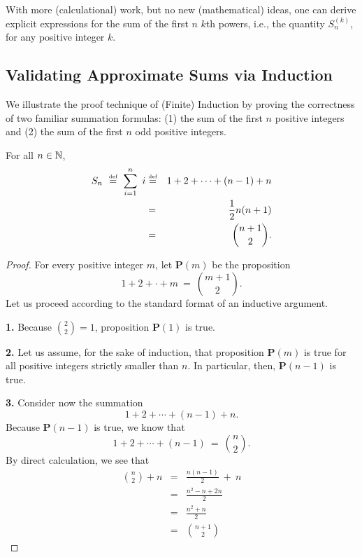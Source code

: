\documentclass{article}
\begin{document}
\begin{itemize}
With more (calculational) work, but no new (mathematical) ideas, one
can derive explicit expressions for the sum of the first $n$ $k$th
powers, i.e., the quantity $S^{(k)}_n$, for any positive integer $k$.


\subsection{Validating Approximate Sums via Induction}
\label{sec:Sums-Induction}


We illustrate the proof technique of (Finite) Induction by proving the
correctness of two familiar summation formulas: (1) the sum of the
first $n$ positive integers and (2) the sum of the first $n$ odd
positive integers.


\begin{center}
\label{thm:sum-1-to-n-induction}
For all $n \in \mathbb{N}$,
\begin{eqnarray}
\nonumber
S_n \ \stackrel{\mbox{{\tiny def}}}{=} \ \sum_{i=1}^n \ i
 & \stackrel{\mbox{{\tiny def}}}{=} &
 1 + 2 + \cdots + (n-1) + n \\
\label{eq:sum-first-n}
 & = & {1 \over 2} n (n+1) \\
\nonumber
 & = & {{n+1}  \choose 2}.
\end{eqnarray}
\end{center}

\begin{proof}
For every positive integer $m$, let {\bf P}$(m)$ be the proposition
\[  1 + 2 + \cdot + m \ = \ {{m+1} \choose 2}. \]
Let us proceed according to the standard format of an inductive
argument.

{\bf 1.} Because ${\displaystyle {2 \choose 2}} = 1$, proposition {\bf
  P}$(1)$ is true.

{\bf 2.} Let us assume, for the sake of induction, that proposition
{\bf P}$(m)$ is true for all positive integers strictly smaller than
$n$.  In particular, then, {\bf P}$(n-1)$ is true.

{\bf 3.} Consider now the summation
\[ 1 + 2 + \cdots + (n-1) + n. \]
Because {\bf P}$(n-1)$ is true, we know that
\[ 1 + 2 + \cdots + (n-1) \ = \ {n \choose 2}.  \]
By direct calculation, we see that
\begin{eqnarray*}
{n \choose 2} + n
  & = & \frac{n(n-1)}{2}  \ + \ n \\ 
  & = & \frac{n^2 - n + 2n}{2} \\
  & = & \frac{n^2 + n}{2} \\
  & = & {{n+1} \choose 2}
\end{eqnarray*}


\end{proof}
\end{itemize}
\end{document}
